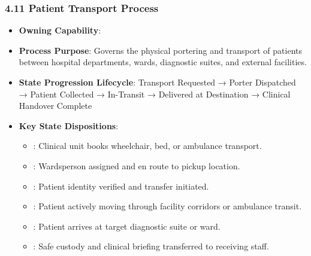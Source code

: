 \par\smallskip
{}\label{rad:processes:233}
\subsubsection*{4.11 Patient Transport Process}
\label{rad:processes:234}

\begin{itemize}

\item
\textbf{Owning Capability}: \texttt{}



\item
\textbf{Process Purpose}: Governs the physical portering and transport of patients between hospital departments, wards, diagnostic suites, and external facilities.



\item
\textbf{State Progression Lifecycle}: Transport Requested → Porter Dispatched → Patient Collected → In-Transit → Delivered at Destination → Clinical Handover Complete



\item
\textbf{Key State Dispositions}:


\begin{itemize}

\item
\texttt{}: Clinical unit books wheelchair, bed, or ambulance transport.



\item
\texttt{}: Wardsperson assigned and en route to pickup location.



\item
\texttt{}: Patient identity verified and transfer initiated.



\item
\texttt{}: Patient actively moving through facility corridors or ambulance transit.



\item
\texttt{}: Patient arrives at target diagnostic suite or ward.



\item
\texttt{}: Safe custody and clinical briefing transferred to receiving staff.



\end{itemize}


\end{itemize}
\label{rad:processes:246}

